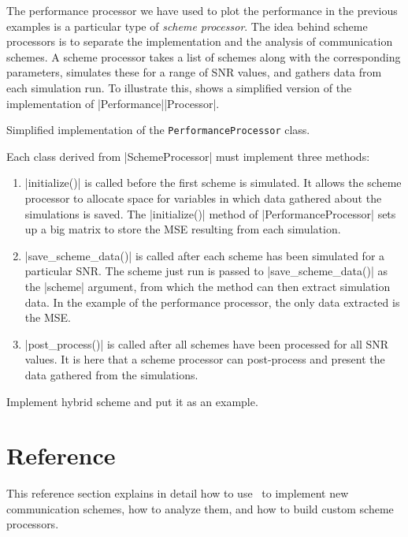 The performance processor we have used to plot the performance in the previous
examples is a particular type of \emph{scheme processor}. The idea behind scheme
processors is to separate the implementation and the analysis of communication
schemes. A scheme processor takes a list of schemes along
with the corresponding parameters, simulates these for a range of SNR
values, and gathers data from each simulation run.  To illustrate
this,  shows a simplified version of the implementation of
|Performance|\-|Processor|. 

\begin{listing}
\caption{Simplified implementation of the \texttt{PerformanceProcessor} class.}
\label{lst:perfproc}
\end{listing}

Each class derived from |SchemeProcessor| must implement three methods:
\begin{enumerate}
  \item |initialize()| is called before the first scheme is simulated. It allows
    the scheme processor to allocate space for variables in which data gathered
    about the simulations is saved. The |initialize()| method of
    |PerformanceProcessor| sets up a big matrix to store the MSE resulting from
    each simulation. 

  \item |save_scheme_data()| is called after each scheme has been
    simulated for a particular SNR. The scheme just run is passed to
    |save_scheme_data()| as the |scheme| argument, from which the method can
    then extract simulation data. In the example of the performance processor,
    the only data extracted is the MSE.

  \item |post_process()| is called after all schemes have been processed
    for all SNR values. It is here that a scheme processor can post-process and
    present the data gathered from the simulations.
\end{enumerate}


\todo Implement hybrid scheme and put it as an example.


\section{Reference}\label{sec:reference}

This reference section explains in detail how to use \jscsim\ to implement new
communication schemes, how to analyze them, and how to build custom scheme
processors. 


